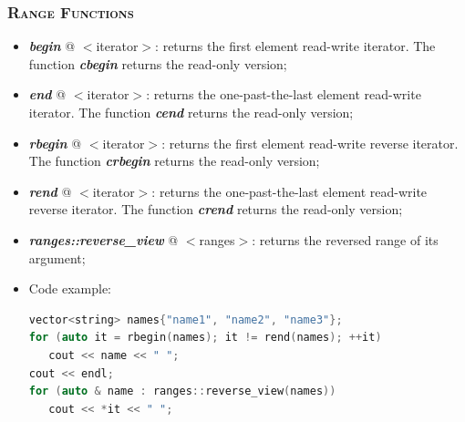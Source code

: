 \documentclass[10pt]{article}
\begin{document}
\begin{multicols*}{4}
{\subsubsection*{\textsc{Range Functions}} 
\begin{itemize}[leftmargin=*,topsep=0.25pt]
  \setlength\itemsep{-1.8pt}
	\item  \emph{\textbf{begin}} @ $<$iterator$>$: returns the first element read-write iterator. The function \emph{\textbf{cbegin}} returns the read-only version;
	\item  \emph{\textbf{end}} @ $<$iterator$>$: returns the one-past-the-last element read-write iterator. The function \emph{\textbf{cend}} returns the read-only version;
	\item  \emph{\textbf{rbegin}} @ $<$iterator$>$: returns the first element read-write reverse iterator. The function \emph{\textbf{crbegin}} returns the read-only version;
 	\item  \emph{\textbf{rend}} @ $<$iterator$>$: returns the one-past-the-last element read-write reverse iterator. The function \emph{\textbf{crend}} returns the read-only version;
	\item  \emph{\textbf{ranges::reverse\_view}} @ $<$ranges$>$: returns the reversed range of its argument;
\item Code example:
{\selectfont \lstset{style=mystyle}
 \begin{lstlisting}[language=C++]
vector<string> names{"name1", "name2", "name3"};
for (auto it = rbegin(names); it != rend(names); ++it)
   cout << name << " ";
cout << endl;
for (auto & name : ranges::reverse_view(names))
   cout << *it << " ";
\end{lstlisting}
}

\end{itemize}

}
\end{multicols*}
\end{document}
